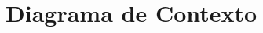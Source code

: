 \documentclass[a4paper]{article}
\begin{document}
\newtheorem{teo}{Teorema}[section]
\newtheorem{propo}{Proposici\'{o}n}[section]
\newtheorem{lema}{Lema}[section]
\newtheorem{coro}{Corolario}[section]
\newtheorem{defi}{Definici\'{o}n}[section]

\newpage
\thispagestyle{empty}
\tableofcontents

\parskip=5pt
\setlength{\parindent}{0pt}

\newpage
\setcounter{page}{1}
\pagestyle{plain}

\newpage


\newcommand{\Asig}{\ensuremath{\leftarrow}}
\newcommand{\AndY}{\ensuremath{\wedge}}
\newcommand{\Or}{\ensuremath{\vee}}
\newcommand{\Not}{\ensuremath{\neg}}
\newcommand{\NotEq}{\ensuremath{\neq}}
\newcommand{\MayorIg}{\ensuremath{\geq}}
\newcommand{\tabu}{\hspace*{0.7cm}}
\newcommand{\ctabu}{\hspace*{0.8cm}}
\newcommand{\htabu}{\hspace*{0.35cm}}
\newcommand{\moduloNombre}[1]{\textbf{#1}}



\section{Diagrama de Contexto}
\end{document}
